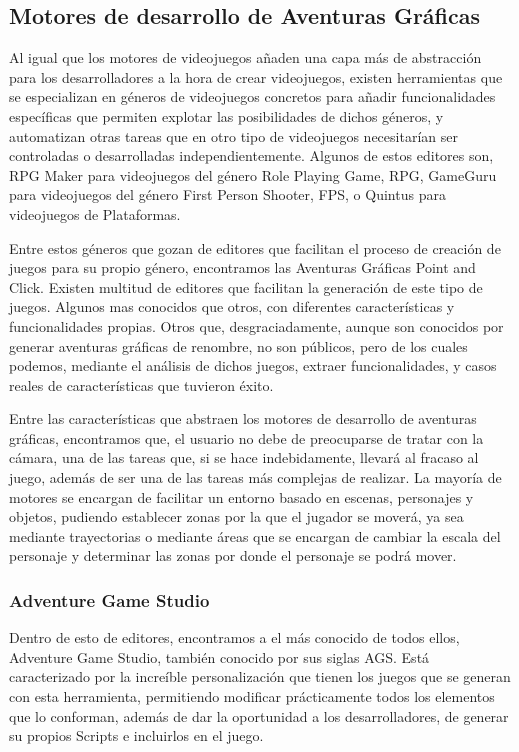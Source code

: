 \subsection{Motores de desarrollo de Aventuras Gráficas}
\label{herramientasaventuras}

Al igual que los motores de videojuegos añaden una capa más de abstracción para los desarrolladores a la hora de crear videojuegos, existen herramientas que se especializan en géneros de videojuegos concretos para añadir funcionalidades específicas que permiten explotar las posibilidades de dichos géneros, y automatizan otras tareas que en otro tipo de videojuegos necesitarían ser controladas o desarrolladas independientemente. Algunos de estos editores son, RPG Maker para videojuegos del género Role Playing Game, RPG, GameGuru para videojuegos del género First Person Shooter, FPS, o Quintus para videojuegos de Plataformas.

Entre estos géneros que gozan de editores que facilitan el proceso de creación de juegos para su propio género, encontramos las Aventuras Gráficas Point and Click. Existen multitud de editores que facilitan la generación de este tipo de juegos. Algunos mas conocidos que otros, con diferentes características y funcionalidades propias. Otros que, desgraciadamente, aunque son conocidos por generar aventuras gráficas de renombre, no son públicos, pero de los cuales podemos, mediante el análisis de dichos juegos, extraer funcionalidades, y casos reales de características que tuvieron éxito.

Entre las características que abstraen los motores de desarrollo de aventuras gráficas, encontramos que, el usuario no debe de preocuparse de tratar con la cámara, una de las tareas que, si se hace indebidamente, llevará al fracaso al juego, además de ser una de las tareas más complejas de realizar. La mayoría de motores se encargan de facilitar un entorno basado en escenas, personajes y objetos, pudiendo establecer zonas por la que el jugador se moverá, ya sea mediante trayectorias o mediante áreas que se encargan de cambiar la escala del personaje y determinar las zonas por donde el personaje se podrá mover.

\subsubsection{Adventure Game Studio}
\label{adventuregamestudio}

Dentro de esto de editores, encontramos a el más conocido de todos ellos, Adventure Game Studio, también conocido por sus siglas AGS. Está caracterizado por la increíble personalización que tienen los juegos que se generan con esta herramienta, permitiendo modificar prácticamente todos los elementos que lo conforman, además de dar la oportunidad a los desarrolladores, de generar su propios Scripts e incluirlos en el juego. 

